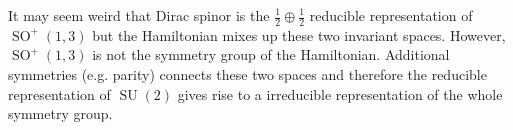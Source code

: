 \documentclass{article}
\begin{document}
It may seem weird that Dirac spinor is the $\frac{1}{2}\oplus \frac{1}{2}$ reducible representation of $\operatorname{SO}^+(1,3)$ but the Hamiltonian mixes up these two invariant spaces.
However, $\operatorname{SO}^+(1,3)$ is not the symmetry group of the Hamiltonian.
Additional symmetries (e.g. parity) connects these two spaces and therefore the reducible representation of $\operatorname{SU}(2)$ gives rise to a irreducible representation of the whole symmetry group.



\end{document}
